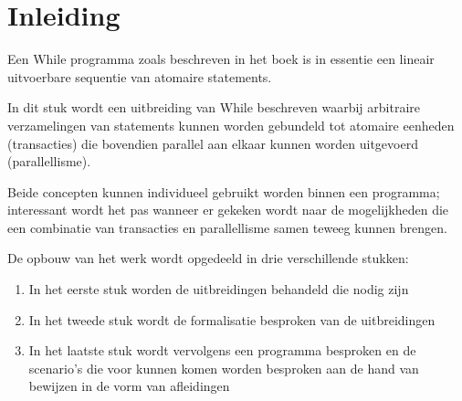\section*{Inleiding}

Een While programma zoals beschreven in het boek \cite{SemanticsWithApplications} is in
essentie een lineair uitvoerbare sequentie van atomaire statements.

In dit stuk wordt een uitbreiding van While beschreven waarbij arbitraire verzamelingen van statements kunnen worden
gebundeld tot atomaire eenheden (transacties) die bovendien parallel aan elkaar kunnen worden uitgevoerd
(parallellisme).

Beide concepten kunnen individueel gebruikt worden binnen een programma; interessant wordt het pas wanneer er gekeken
wordt naar de mogelijkheden die een combinatie van transacties en parallellisme samen teweeg kunnen brengen.

De opbouw van het werk wordt opgedeeld in drie verschillende stukken:
\begin{enumerate}
  \item In het eerste stuk worden de uitbreidingen behandeld die nodig zijn
  \item In het tweede stuk wordt de formalisatie besproken van de uitbreidingen
  \item In het laatste stuk wordt vervolgens een programma besproken en de
  scenario's die voor kunnen komen worden besproken aan de hand van bewijzen in de vorm van afleidingen
\end{enumerate}
